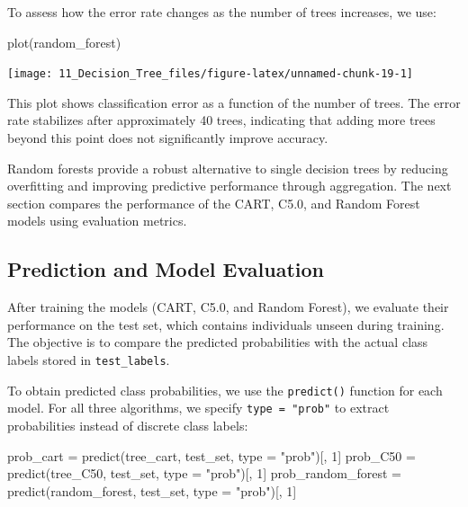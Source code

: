 \documentclass[
  11pt,
]{book}
\makeatletter
\newenvironment{Shaded}{}{}
\newcommand{\AttributeTok}[1]{#1}
\newcommand{\DecValTok}[1]{#1}
\newcommand{\FunctionTok}[1]{#1}
\newcommand{\NormalTok}[1]{#1}
\newcommand{\OtherTok}[1]{\textcolor[rgb]{0.39,0.39,0.39}{#1}}
\newcommand{\StringTok}[1]{\textcolor[rgb]{0.39,0.39,0.39}{#1}}
\newenvironment{kframe}{%
\medskip{}
\setlength{\fboxsep}{.8em}
 \def\at@end@of@kframe{}%
 \ifinner\ifhmode%
  \def\at@end@of@kframe{\end{minipage}}%
  \begin{minipage}{\columnwidth}%
 \fi\fi%
 \def\FrameCommand##1{\hskip\@totalleftmargin \hskip-\fboxsep
 \colorbox{shadecolor}{##1}\hskip-\fboxsep
     \hskip-\linewidth \hskip-\@totalleftmargin \hskip\columnwidth}%
 \MakeFramed {\advance\hsize-\width
   \@totalleftmargin\z@ \linewidth\hsize
   \@setminipage}}%
 {\par\unskip\endMakeFramed%
 \at@end@of@kframe}
\renewenvironment{Shaded}{\begin{kframe}}{\end{kframe}}
\theoremstyle{definition}
\theoremstyle{definition}
\theoremstyle{definition}
\theoremstyle{definition}
\theoremstyle{remark}
\makeatother
\begin{document}
To assess how the error rate changes as the number of trees increases, we use:

\begin{Shaded}
\begin{Highlighting}[]
\FunctionTok{plot}\NormalTok{(random\_forest)}
\end{Highlighting}
\end{Shaded}

\begin{center}\texttt{[image: 11\_Decision\_Tree\_files/figure-latex/unnamed-chunk-19-1]} \end{center}

This plot shows classification error as a function of the number of trees. The error rate stabilizes after approximately 40 trees, indicating that adding more trees beyond this point does not significantly improve accuracy.

Random forests provide a robust alternative to single decision trees by reducing overfitting and improving predictive performance through aggregation. The next section compares the performance of the CART, C5.0, and Random Forest models using evaluation metrics.

\subsection*{Prediction and Model Evaluation}\label{prediction-and-model-evaluation-1}


After training the models (CART, C5.0, and Random Forest), we evaluate their performance on the test set, which contains individuals unseen during training. The objective is to compare the predicted probabilities with the actual class labels stored in \texttt{test\_labels}.

To obtain predicted class probabilities, we use the \texttt{predict()} function for each model. For all three algorithms, we specify \texttt{type\ =\ "prob"} to extract probabilities instead of discrete class labels:

\begin{Shaded}
\begin{Highlighting}[]
\NormalTok{prob\_cart }\OtherTok{=} \FunctionTok{predict}\NormalTok{(tree\_cart, test\_set, }\AttributeTok{type =} \StringTok{"prob"}\NormalTok{)[, }\DecValTok{1}\NormalTok{]}
\NormalTok{prob\_C50 }\OtherTok{=} \FunctionTok{predict}\NormalTok{(tree\_C50, test\_set, }\AttributeTok{type =} \StringTok{"prob"}\NormalTok{)[, }\DecValTok{1}\NormalTok{]}
\NormalTok{prob\_random\_forest }\OtherTok{=} \FunctionTok{predict}\NormalTok{(random\_forest, test\_set, }\AttributeTok{type =} \StringTok{"prob"}\NormalTok{)[, }\DecValTok{1}\NormalTok{]}
\end{Highlighting}
\end{Shaded}
\end{document}
